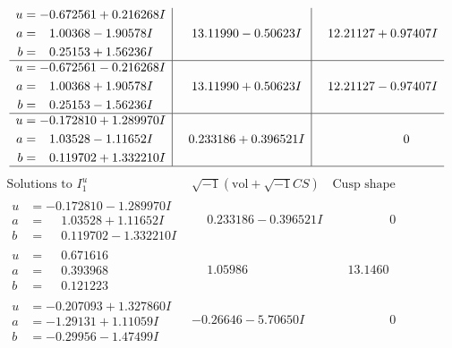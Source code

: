 \documentclass[1p]{elsarticle_modified}
\theoremstyle{definition}
\newcommand{\I}{\sqrt{-1}}
\begin{document}
$$\begin{array}{c|c|c}
\begin{aligned}
u &= -0.672561 + 0.216268 I \\
a &= \phantom{-}1.00368 - 1.90578 I \\
b &= \phantom{-}0.25153 + 1.56236 I\end{aligned}
 & \phantom{-}13.11990 - 0.50623 I & \phantom{-}12.21127 + 0.97407 I \\ \hline\begin{aligned}
u &= -0.672561 - 0.216268 I \\
a &= \phantom{-}1.00368 + 1.90578 I \\
b &= \phantom{-}0.25153 - 1.56236 I\end{aligned}
 & \phantom{-}13.11990 + 0.50623 I & \phantom{-}12.21127 - 0.97407 I \\ \hline\begin{aligned}
u &= -0.172810 + 1.289970 I \\
a &= \phantom{-}1.03528 - 1.11652 I \\
b &= \phantom{-}0.119702 + 1.332210 I\end{aligned}
 & \phantom{-}0.233186 + 0.396521 I & \phantom{-0.000000 } 0\\
 \hline 
 \end{array}$$\newpage$$\begin{array}{c|c|c}  
\text{Solutions to }I^u_{1}& \I (\text{vol} + \sqrt{-1}CS) & \text{Cusp shape}\\
 \hline 
\begin{aligned}
u &= -0.172810 - 1.289970 I \\
a &= \phantom{-}1.03528 + 1.11652 I \\
b &= \phantom{-}0.119702 - 1.332210 I\end{aligned}
 & \phantom{-}0.233186 - 0.396521 I & \phantom{-0.000000 } 0 \\ \hline\begin{aligned}
u &= \phantom{-}0.671616\phantom{ +0.000000I} \\
a &= \phantom{-}0.393968\phantom{ +0.000000I} \\
b &= \phantom{-}0.121223\phantom{ +0.000000I}\end{aligned}
 & \phantom{-}1.05986\phantom{ +0.000000I} & \phantom{-}13.1460\phantom{ +0.000000I} \\ \hline\begin{aligned}
u &= -0.207093 + 1.327860 I \\
a &= -1.29131 + 1.11059 I \\
b &= -0.29956 - 1.47499 I\end{aligned}
 & -0.26646 - 5.70650 I & \phantom{-0.000000 } 0 \\ \hline\begin{aligned}

\end{aligned}
\end{array}$$
\end{document}
